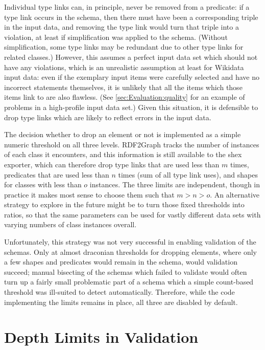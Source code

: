 Individual \glspl{type link} can, in principle, never be removed from a \gls{predicate}:
if a \gls{type link} occurs in the \gls{schema},
then there must have been a corresponding \gls{triple} in the input data,
and removing the \gls{type link} would turn that \gls{triple} into a violation,
at least if simplification was applied to the \gls{schema}.
(Without simplification, some \glspl{type link} may be redundant
due to other \glspl{type link} for related classes.)
However, this assumes a perfect input data set which should not have any violations,
which is an unrealistic assumption at least for \gls{Wikidata} input data:
even if the exemplary input \glspl{item} were carefully selected
and have no incorrect \glspl{statement} themselves,
it is unlikely that all the \glspl{item} which those \glspl{item} link to are also flawless.
(See \cref{sec:Evaluation:quality} for an example of problems in a high-profile input data set.)
Given this situation, it is defensible to drop \glspl{type link}
which are likely to reflect errors in the input data.

The decision whether to drop an element or not
is implemented as a simple numeric threshold on all three levels.
\Gls{RDF2Graph} tracks the number of instances of each class it encounters,
and this information is still available to the \gls{shex} exporter,
which can therefore drop \glspl{type link} that are used less than $m$ times,
\glspl{predicate} that are used less than $n$ times (sum of all \gls{type link} uses),
and \glspl{shape} for classes with less than $o$ instances.
The three limits are independent,
though in practice it makes most sense to choose them such that $m > n > o$.
An alternative strategy to explore in the future might be
to turn those fixed thresholds into ratios,
so that the same parameters can be used for vastly different data sets
with varying numbers of class instances overall.

Unfortunately, this strategy was not very successful in enabling validation of the \glspl{schema}.
Only at almost draconian thresholds for dropping elements,
where only a few \glspl{shape} and \glspl{predicate} would remain in the \gls{schema},
would validation succeed;
manual bisecting of the \glspl{schema} which failed to validate
would often turn up a fairly small problematic part of a \gls{schema}
which a simple count-based threshold was ill-suited to detect automatically.
Therefore, while the code implementing the limits remains in place,
all three are disabled by default.

\section{Depth Limits in Validation}
\label{sec:RDF2Graph+Wikidata:depth-limit}

